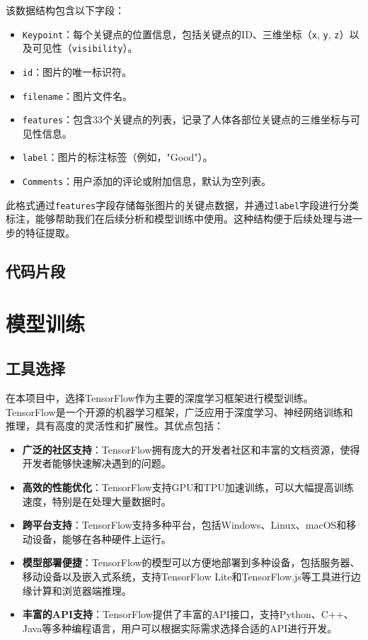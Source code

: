 \noindent 该数据结构包含以下字段：
\begin{itemize}
    \item \texttt{Keypoint}：每个关键点的位置信息，包括关键点的ID、三维坐标（\texttt{x}, \texttt{y}, \texttt{z}）以及可见性（\texttt{visibility}）。
    \item \texttt{id}：图片的唯一标识符。
    \item \texttt{filename}：图片文件名。
    \item \texttt{features}：包含33个关键点的列表，记录了人体各部位关键点的三维坐标与可见性信息。
    \item \texttt{label}：图片的标注标签（例如，"Good"）。
    \item \texttt{Comments}：用户添加的评论或附加信息，默认为空列表。
\end{itemize}

\noindent 此格式通过\texttt{features}字段存储每张图片的关键点数据，并通过\texttt{label}字段进行分类标注，能够帮助我们在后续分析和模型训练中使用。这种结构便于后续处理与进一步的特征提取。


\subsection{代码片段}

\section{模型训练}

\subsection{工具选择}

在本项目中，选择TensorFlow作为主要的深度学习框架进行模型训练。TensorFlow是一个开源的机器学习框架，广泛应用于深度学习、神经网络训练和推理，具有高度的灵活性和扩展性。其优点包括：

\begin{itemize}
    \item \textbf{广泛的社区支持}：TensorFlow拥有庞大的开发者社区和丰富的文档资源，使得开发者能够快速解决遇到的问题。
    \item \textbf{高效的性能优化}：TensorFlow支持GPU和TPU加速训练，可以大幅提高训练速度，特别是在处理大量数据时。
    \item \textbf{跨平台支持}：TensorFlow支持多种平台，包括Windows、Linux、macOS和移动设备，能够在各种硬件上运行。
    \item \textbf{模型部署便捷}：TensorFlow的模型可以方便地部署到多种设备，包括服务器、移动设备以及嵌入式系统，支持TensorFlow Lite和TensorFlow.js等工具进行边缘计算和浏览器端推理。
    \item \textbf{丰富的API支持}：TensorFlow提供了丰富的API接口，支持Python、C++、Java等多种编程语言，用户可以根据实际需求选择合适的API进行开发。
\end{itemize}

